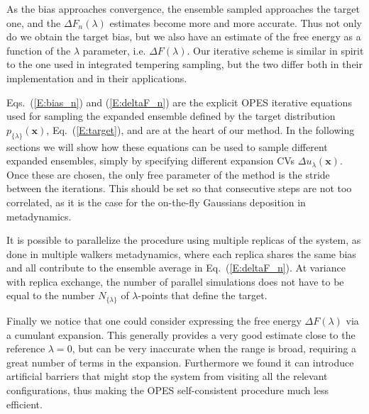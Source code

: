 \documentclass[aps,prx,reprint,superscriptaddress]{revtex4-1} %
\begin{document}
As the bias approaches convergence, the ensemble sampled approaches the target one, and the $\Delta F_n(\lambda)$ estimates become more and more accurate.
Thus not only do we obtain the target bias, but we also have an estimate of the free energy as a function of the $\lambda$ parameter, i.e. $\Delta F(\lambda)$.
Our iterative scheme is similar in spirit to the one used in integrated tempering sampling\cite{Gao2008}, but the two differ both in their implementation and in their applications.

Eqs.~(\ref{E:bias_n}) and (\ref{E:deltaF_n}) are the explicit OPES iterative equations used for sampling the expanded ensemble defined by the target distribution $p_{\{\lambda\}}(\mathbf{x})$, Eq.~(\ref{E:target}), and are at the heart of our method.
In the following sections we will show how these equations can be used to sample different expanded ensembles, simply by specifying different expansion CVs $\Delta u_\lambda(\mathbf{x})$.
Once these are chosen, the only free parameter of the method is the stride between the iterations.
This should be set so that consecutive steps are not too correlated, as it is the case for the on-the-fly Gaussians deposition in metadynamics.

It is possible to parallelize the procedure using multiple replicas of the system, as done in  multiple walkers metadynamics\cite{Raiteri2006}, where each replica shares the same bias and all contribute to the ensemble average in Eq.~(\ref{E:deltaF_n}).
At variance with replica exchange, the number of parallel simulations does not have to be equal to the number $N_{\{\lambda\}}$ of $\lambda$-points that define the target.

Finally we notice that one could consider expressing the free energy $\Delta F(\lambda)$ via a cumulant expansion\cite{Park2008,Radak2018}.
This generally provides a very good estimate close to the reference $\lambda=0$, but can be very inaccurate when the range is broad, requiring a great number of terms in the expansion. 
Furthermore we found it can introduce artificial barriers that might stop the system from visiting all the relevant configurations, thus making the OPES self-consistent procedure much less efficient.


\end{document}
